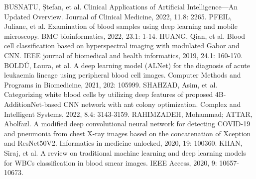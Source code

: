 \documentclass[conference]{IEEEtran}
\begin{document}
\begin{thebibliography}{00}
 BUSNATU, Ștefan, et al. Clinical Applications of Artificial Intelligence—An Updated Overview. Journal of Clinical Medicine, 2022, 11.8: 2265.
 PFEIL, Juliane, et al. Examination of blood samples using deep learning and mobile microscopy. BMC bioinformatics, 2022, 23.1: 1-14.
 HUANG, Qian, et al. Blood cell classification based on hyperspectral imaging with modulated Gabor and CNN. IEEE journal of biomedical and health informatics, 2019, 24.1: 160-170.
 BOLDÚ, Laura, et al. A deep learning model (ALNet) for the diagnosis of acute leukaemia lineage using peripheral blood cell images. Computer Methods and Programs in Biomedicine, 2021, 202: 105999.
 SHAHZAD, Asim, et al. Categorizing white blood cells by utilizing deep features of proposed 4B-AdditionNet-based CNN network with ant colony optimization. Complex and Intelligent Systems, 2022, 8.4: 3143-3159.
 RAHIMZADEH, Mohammad; ATTAR, Abolfazl. A modified deep convolutional neural network for detecting COVID-19 and pneumonia from chest X-ray images based on the concatenation of Xception and ResNet50V2. Informatics in medicine unlocked, 2020, 19: 100360.
 KHAN, Siraj, et al. A review on traditional machine learning and deep learning models for WBCs classification in blood smear images. IEEE Access, 2020, 9: 10657-10673.
\end{thebibliography}
\vspace{12pt}
\color{red}
\end{document}
